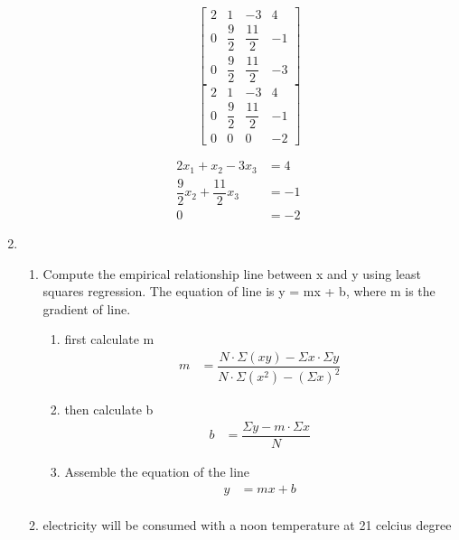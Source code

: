 \documentclass{article}
\begin{document}
\begin{enumerate}
\begin{enumerate}
\begin{equation}
      \end{equation}
      \begin{equation}
        \left [\begin{array}{ccc|c} \label{eq3} 2 & 1 & -3 & 4\\ 0 & \dfrac{9}{2} & \dfrac{11}{2} & -1\\0 & \dfrac{9}{2} & \dfrac{11}{2} & -3 \end{array}\right]
      \end{equation}
      \begin{equation}
        \left [\begin{array}{ccc|c} \label{eq4} 2 & 1 & -3 & 4\\ 0 & \dfrac{9}{2} & \dfrac{11}{2} & -1\\0 & 0 & 0 &-2 \end{array}\right]
      \end{equation}
  \end{enumerate}
  \begin{align*} \label{eq5} 2x_{1} + x_{2} - 3x_{3} &= 4 \\ \dfrac{9}{2} x_{2} + \dfrac{11}{2} x_{3} &= -1 \\ 0 &= -2 \end{align*}
  \item 
  \begin{enumerate}
      \item Compute the empirical relationship line between x and y using least squares regression. The equation of line is y = mx + b, where m is the gradient of line. 
      \begin{enumerate}
          \item first calculate m 
          \begin{align*}
              m &= \dfrac{N \cdot \Sigma (xy) - \Sigma x \cdot \Sigma y}{N \cdot \Sigma (x^2) - (\Sigma x)^2} 
          \end{align*}
          \item then calculate b
          \begin{align*}
              b &= \dfrac{\Sigma y - m \cdot \Sigma x}{N}
          \end{align*}
          \item Assemble the equation of the line
          \begin{align*}
              y &= mx + b \\ 
          \end{align*}
      \end{enumerate}
      \item electricity will be consumed with a noon temperature at 21 celcius degree
  \end{enumerate} 
  
\end{enumerate}
\end{document}
